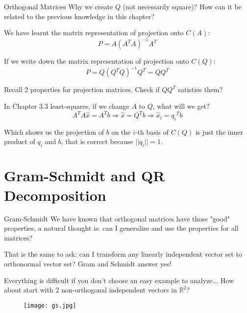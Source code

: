 \documentclass{beamer}
\begin{document}
\begin{frame}{Orthogonal Matrices}
Why we create $Q$ (not necessarily square)? How can it be related to the previous knowledge in this chapter?

\vspace{3pt}
We have learnt the matrix representation of projection onto $C(A)$:
\begin{equation*}
    P=A(A^TA)^{-1}A^T
\end{equation*}

If we write down the matrix representation of projection onto $C(Q)$:
\begin{equation*}
    P=Q(Q^TQ)^{-1}Q^T=QQ^T
\end{equation*}

\vspace{3pt}
Recall 2 properties for projection matrices. Check if $QQ^T$ satisties them?

\vspace{3pt}
In Chapter 3.3 least-squares, if we change $A$ to $Q$, what will we get?
\begin{equation*}
    A^TA\hat{x}=A^Tb\Rightarrow \hat{x}=Q^Tb\Rightarrow \hat{x}_i={q_i}^Tb
\end{equation*}

Which shows us the projection of $b$ on the $i$-th basis of $C(Q)$ is just the inner product of $q_i$ and $b$, that is correct because $||q_i||=1$.
\end{frame}

\section{Gram-Schmidt and QR Decomposition}
\begin{frame}{Gram-Schmidt}
We have known that orthogonal matrices have those "good" properties, a natural thought is: can I generalize and use the properties for all matrices?

\vspace{3pt}
That is the same to ask: can I transform any linearly independent vector set to orthonormal vector set? Gram and Schmidt answer yes!

\vspace{3pt}
Everything is difficult if you don't choose an easy example to analyze... How about start with 2 non-orthogonal independent vectors in $\mathbb{R}^2$?

\begin{figure}
    \centering
    \texttt{[image: gs.jpg]}
\end{figure}

\end{frame}
\end{document}
